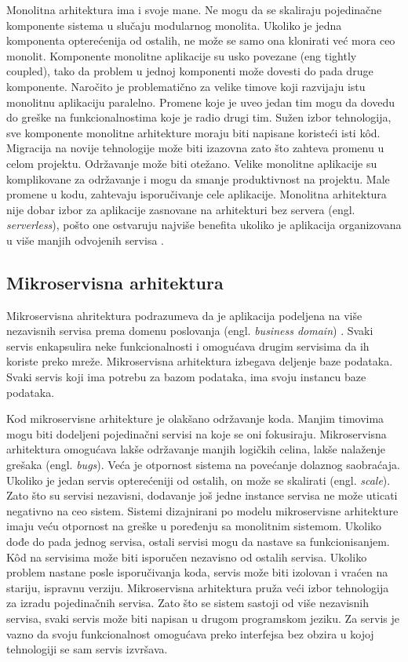 \documentclass[12pt,oneside]{memoir}
\begin{document}
Monolitna arhitektura ima i svoje mane. Ne mogu da se skaliraju pojedinačne komponente sistema u slučaju modularnog monolita. Ukoliko je jedna komponenta opterećenija od ostalih, ne može se samo ona klonirati već mora ceo monolit. Komponente monolitne aplikacije su usko povezane (eng tightly coupled), tako da problem u jednoj komponenti može dovesti do pada druge komponente. Naročito je problematično za velike timove koji razvijaju istu monolitnu aplikaciju paralelno. Promene koje je uveo jedan tim mogu da dovedu do greške na funkcionalnostima koje je radio drugi tim. Sužen izbor tehnologija, sve komponente monolitne arhitekture moraju biti napisane koristeći isti kôd. Migracija na novije tehnologije može biti izazovna zato što zahteva promenu u celom projektu. Održavanje može biti otežano. Velike monolitne aplikacije su komplikovane za održavanje i mogu da smanje produktivnost na projektu. Male promene u kodu, zahtevaju isporučivanje cele aplikacije. Monolitna arhitektura nije dobar izbor za aplikacije zasnovane na arhitekturi bez servera (engl. \emph{serverless}), pošto one ostvaruju najviše benefita ukoliko je aplikacija organizovana u više manjih odvojenih servisa \cite{sa}.

\subsection{Mikroservisna arhitektura}
Mikroservisna ahritektura podrazumeva da je aplikacija podeljena na više nezavisnih servisa prema domenu poslovanja (engl. \emph{business domain}) \cite{bm}. Svaki servis enkapsulira neke funkcionalnosti i omogućava drugim servisima da ih koriste preko mreže. Mikroservisna arhitektura izbegava deljenje baze podataka. Svaki servis koji ima potrebu za bazom podataka, ima svoju instancu baze podataka. 

Kod mikroservisne arhitekture je olakšano održavanje koda. Manjim timovima mogu biti dodeljeni pojedinačni servisi na koje se oni fokusiraju. Mikroservisna arhitektura omogućava lakše održavanje manjih logičkih celina, lakše nalaženje grešaka (engl. \emph{bugs}). Veća je otpornost sistema na povećanje dolaznog saobraćaja. Ukoliko je jedan servis opterećeniji od ostalih, on može se skalirati (engl. \emph{scale}). Zato što su servisi nezavisni, dodavanje još jedne instance servisa ne može uticati negativno na ceo sistem. Sistemi dizajnirani po modelu mikroservisne arhitekture imaju veću otpornost na greške u poređenju sa monolitnim sistemom. Ukoliko dođe do pada jednog servisa, ostali servisi mogu da nastave sa funkcionisanjem. Kôd na servisima može biti isporučen nezavisno od ostalih servisa. Ukoliko problem nastane posle isporučivanja koda, servis može biti izolovan i vraćen na stariju, ispravnu verziju. Mikroservisna arhitektura pruža veći izbor tehnologija za izradu pojedinačnih servisa. Zato što se sistem sastoji od više nezavisnih servisa, svaki servis može biti napisan u drugom programskom jeziku. Za servis je vazno da svoju funkcionalnost omogućava preko interfejsa bez obzira u kojoj tehnologiji se sam servis izvršava.
\end{document}
